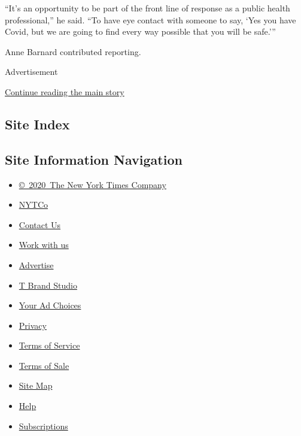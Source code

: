 ``It's an opportunity to be part of the front line of response as a
public health professional,'' he said. ``To have eye contact with
someone to say, `Yes you have Covid, but we are going to find every way
possible that you will be safe.'''

Anne Barnard contributed reporting.

Advertisement

\protect\hyperlink{after-bottom}{Continue reading the main story}

\hypertarget{site-index}{%
\subsection{Site Index}\label{site-index}}

\hypertarget{site-information-navigation}{%
\subsection{Site Information
Navigation}\label{site-information-navigation}}

\begin{itemize}
\tightlist
\item
  \href{https://help.nytimes.com/hc/en-us/articles/115014792127-Copyright-notice}{©~2020~The
  New York Times Company}
\end{itemize}

\begin{itemize}
\tightlist
\item
  \href{https://www.nytco.com/}{NYTCo}
\item
  \href{https://help.nytimes.com/hc/en-us/articles/115015385887-Contact-Us}{Contact
  Us}
\item
  \href{https://www.nytco.com/careers/}{Work with us}
\item
  \href{https://nytmediakit.com/}{Advertise}
\item
  \href{http://www.tbrandstudio.com/}{T Brand Studio}
\item
  \href{https://www.nytimes.com/privacy/cookie-policy\#how-do-i-manage-trackers}{Your
  Ad Choices}
\item
  \href{https://www.nytimes.com/privacy}{Privacy}
\item
  \href{https://help.nytimes.com/hc/en-us/articles/115014893428-Terms-of-service}{Terms
  of Service}
\item
  \href{https://help.nytimes.com/hc/en-us/articles/115014893968-Terms-of-sale}{Terms
  of Sale}
\item
  \href{https://spiderbites.nytimes.com}{Site Map}
\item
  \href{https://help.nytimes.com/hc/en-us}{Help}
\item
  \href{https://www.nytimes.com/subscription?campaignId=37WXW}{Subscriptions}
\end{itemize}
